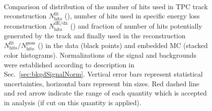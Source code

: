 \begin{figure}[hb]
{\begin{subfigure}[b]{\linewidth}
  \end{subfigure}\\
  \begin{minipage}[t][1.042\linewidth][t]{\linewidth}\vspace{10pt}
    \caption[Comparison of distribution of $N_{\text{hits}}^{\text{fit}}$,~$N_{\text{hits}}^{\text{dE/dx}}$ and $N_{\text{hits}}^{\text{fit}}/N_{\text{hits}}^{\text{poss}}$ in the data and embedded MC.]
    {Comparison of distribution of the number of hits used in TPC track reconstruction $N_{\text{hits}}^{\text{fit}}$ (), number of hits used in specific energy loss reconstruction $N_{\text{hits}}^{\text{dE/dx}}$ () and fraction of number of hits potentially generated by the track and finally used in the reconstruction $N_{\text{hits}}^{\text{fit}}/N_{\text{hits}}^{\text{poss}}$ () in the data (black points) and embedded MC (stacked color histograms). Normalizations of the signal and backgrounds were established according to description in Sec.~\ref{sec:bkgdSignalNorm}. Vertical error bars represent statistical uncertainties, horizontal bars represent bin sizes. Red dashed line and red arrow indicate the range of each quantity which is accepted in analysis (if cut on this quantity is applied).}\label{fig:NHits}
  \end{minipage}
}%

\end{figure}
